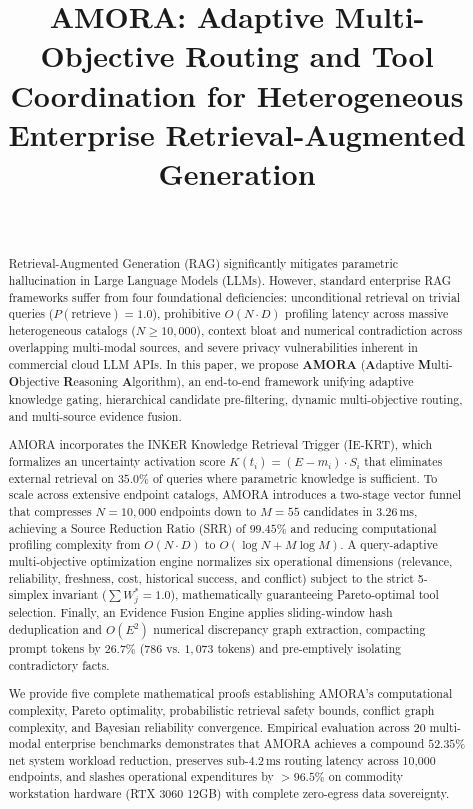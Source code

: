 \documentclass[journal,10pt,twocolumn]{IEEEtran}
\begin{document}
\title{AMORA: Adaptive Multi-Objective Routing and Tool Coordination for Heterogeneous Enterprise Retrieval-Augmented Generation}

\author{
     \\
}

\maketitle

\begin{abstract}
Retrieval-Augmented Generation (RAG) significantly mitigates parametric hallucination in Large Language Models (LLMs). However, standard enterprise RAG frameworks suffer from four foundational deficiencies: unconditional retrieval on trivial queries ($P(\text{retrieve}) = 1.0$), prohibitive $O(N \cdot D)$ profiling latency across massive heterogeneous catalogs ($N \ge 10,000$), context bloat and numerical contradiction across overlapping multi-modal sources, and severe privacy vulnerabilities inherent in commercial cloud LLM APIs. In this paper, we propose \textbf{AMORA} (\textbf{A}daptive \textbf{M}ulti-\textbf{O}bjective \textbf{R}easoning \textbf{A}lgorithm), an end-to-end framework unifying adaptive knowledge gating, hierarchical candidate pre-filtering, dynamic multi-objective routing, and multi-source evidence fusion. 

AMORA incorporates the INKER Knowledge Retrieval Trigger (IE-KRT), which formalizes an uncertainty activation score $K(t_i) = (E - m_i) \cdot S_i$ that eliminates external retrieval on $35.0\%$ of queries where parametric knowledge is sufficient. To scale across extensive endpoint catalogs, AMORA introduces a two-stage vector funnel that compresses $N=10,000$ endpoints down to $M=55$ candidates in $3.26\,\text{ms}$, achieving a Source Reduction Ratio (SRR) of $99.45\%$ and reducing computational profiling complexity from $O(N \cdot D)$ to $O(\log N + M \log M)$. A query-adaptive multi-objective optimization engine normalizes six operational dimensions (relevance, reliability, freshness, cost, historical success, and conflict) subject to the strict 5-simplex invariant ($\sum W_j^* = 1.0$), mathematically guaranteeing Pareto-optimal tool selection. Finally, an Evidence Fusion Engine applies sliding-window hash deduplication and $O(E^2)$ numerical discrepancy graph extraction, compacting prompt tokens by $26.7\%$ ($786$ vs. $1,073$ tokens) and pre-emptively isolating contradictory facts. 

We provide five complete mathematical proofs establishing AMORA's computational complexity, Pareto optimality, probabilistic retrieval safety bounds, conflict graph complexity, and Bayesian reliability convergence. Empirical evaluation across 20 multi-modal enterprise benchmarks demonstrates that AMORA achieves a compound $52.35\%$ net system workload reduction, preserves sub-$4.2\,\text{ms}$ routing latency across 10,000 endpoints, and slashes operational expenditures by $>96.5\%$ on commodity workstation hardware (RTX 3060 12GB) with complete zero-egress data sovereignty.
\end{abstract}
\end{document}
